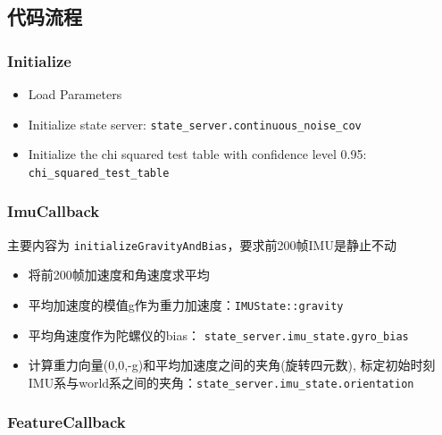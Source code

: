 \documentclass[12pt,a4paper]{article}
\begin{document}
\subsection{代码流程}

\subsubsection{Initialize}

\begin{itemize}
\item Load Parameters
\item Initialize state server: \verb|state_server.continuous_noise_cov|
\item Initialize the chi squared test table with confidence level 0.95: \verb|chi_squared_test_table|
\end{itemize}

\subsubsection{ImuCallback}

主要内容为 \verb|initializeGravityAndBias|，要求前200帧IMU是静止不动

\begin{itemize}
\item 将前200帧加速度和角速度求平均
\item 平均加速度的模值g作为重力加速度：\verb|IMUState::gravity|
\item 平均角速度作为陀螺仪的bias： \verb|state_server.imu_state.gyro_bias|
\item 计算重力向量(0,0,-g)和平均加速度之间的夹角(旋转四元数), 标定初始时刻IMU系与world系之间的夹角：\verb|state_server.imu_state.orientation|
\end{itemize}

\subsubsection{FeatureCallback}
\end{document}
